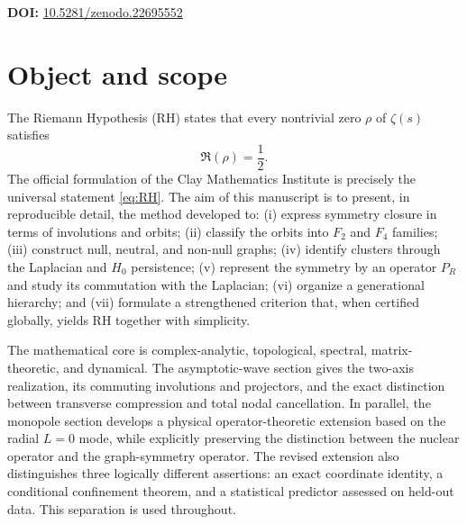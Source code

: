 \documentclass[11pt]{amsart}
\theoremstyle{definition}
\theoremstyle{remark}
\begin{document}
\maketitle
\begin{center}
\small\textbf{DOI:} \href{https://doi.org/10.5281/zenodo.22695552}{10.5281/zenodo.22695552}
\end{center}

\section{Object and scope}
The Riemann Hypothesis (RH) states that every nontrivial zero $\rho$ of $\zeta(s)$ satisfies
\begin{equation}\label{eq:RH}
   \Re(\rho)=\frac12.
\end{equation}
The official formulation of the Clay Mathematics Institute is precisely the universal statement \eqref{eq:RH}. The aim of this manuscript is to present, in reproducible detail, the method developed to: (i) express symmetry closure in terms of involutions and orbits; (ii) classify the orbits into $F_2$ and $F_4$ families; (iii) construct null, neutral, and non-null graphs; (iv) identify clusters through the Laplacian and $H_0$ persistence; (v) represent the symmetry by an operator $P_R$ and study its commutation with the Laplacian; (vi) organize a generational hierarchy; and (vii) formulate a strengthened criterion that, when certified globally, yields RH together with simplicity.

The mathematical core is complex-analytic, topological, spectral, matrix-theoretic, and dynamical.  The asymptotic-wave section gives the two-axis realization, its commuting involutions and projectors, and the exact distinction between transverse compression and total nodal cancellation.  In parallel, the monopole section develops a physical operator-theoretic extension based on the radial $L=0$ mode, while explicitly preserving the distinction between the nuclear operator and the graph-symmetry operator.  The revised extension also distinguishes three logically different assertions: an exact coordinate identity, a conditional confinement theorem, and a statistical predictor assessed on held-out data.  This separation is used throughout.
\end{document}
